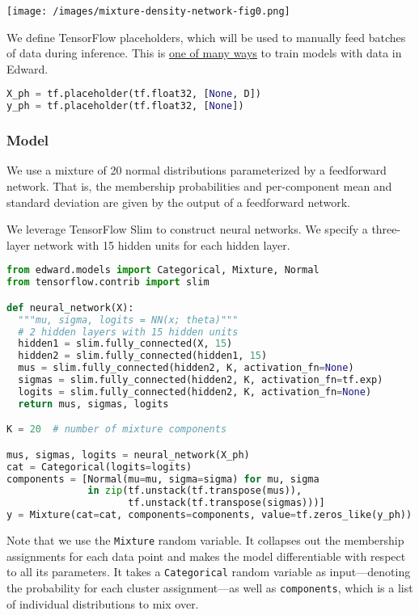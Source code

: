 \texttt{[image: /images/mixture-density-network-fig0.png]}

We define TensorFlow placeholders, which will be used to manually feed batches of data during inference. This is \href{http://edwardlib.org/api/data}{one of many ways} to train models with data in Edward.

\begin{lstlisting}[language=Python]
X_ph = tf.placeholder(tf.float32, [None, D])
y_ph = tf.placeholder(tf.float32, [None])
\end{lstlisting}

\subsubsection{Model}

We use a mixture of 20 normal distributions parameterized by a
feedforward network. That is, the membership probabilities and
per-component mean and standard deviation are given by the output of a
feedforward network.

We leverage TensorFlow Slim to construct neural networks. We specify
a three-layer network with 15 hidden units for each hidden layer.

\begin{lstlisting}[language=Python]
from edward.models import Categorical, Mixture, Normal
from tensorflow.contrib import slim

def neural_network(X):
  """mu, sigma, logits = NN(x; theta)"""
  # 2 hidden layers with 15 hidden units
  hidden1 = slim.fully_connected(X, 15)
  hidden2 = slim.fully_connected(hidden1, 15)
  mus = slim.fully_connected(hidden2, K, activation_fn=None)
  sigmas = slim.fully_connected(hidden2, K, activation_fn=tf.exp)
  logits = slim.fully_connected(hidden2, K, activation_fn=None)
  return mus, sigmas, logits

K = 20  # number of mixture components

mus, sigmas, logits = neural_network(X_ph)
cat = Categorical(logits=logits)
components = [Normal(mu=mu, sigma=sigma) for mu, sigma
              in zip(tf.unstack(tf.transpose(mus)),
                     tf.unstack(tf.transpose(sigmas)))]
y = Mixture(cat=cat, components=components, value=tf.zeros_like(y_ph))
\end{lstlisting}

Note that we use the \texttt{Mixture} random variable. It collapses
out the membership assignments for each data point and makes the model
differentiable with respect to all its parameters. It takes a
\texttt{Categorical} random variable as input—denoting the probability for each
cluster assignment—as well as \texttt{components}, which is a list of
individual distributions to mix over.


